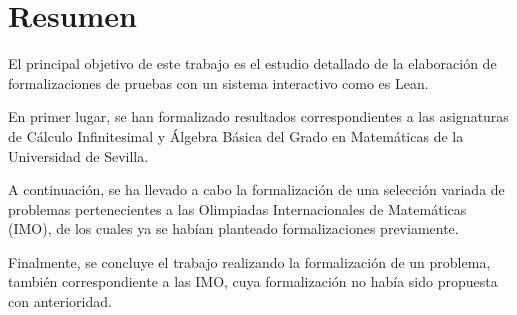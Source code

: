 \chapter*{Resumen}

El principal objetivo de este trabajo es el estudio detallado de la
elaboración de formalizaciones de pruebas con un sistema interactivo
como es Lean.

En primer lugar, se han formalizado resultados correspondientes a las
asignaturas de Cálculo Infinitesimal y Álgebra Básica del Grado en
Matemáticas de la Universidad de Sevilla.

A continuación, se ha llevado a cabo la formalización de una selección
variada de problemas pertenecientes a las Olimpiadas Internacionales de
Matemáticas (IMO), de los cuales ya se habían planteado formalizaciones
previamente.

Finalmente, se concluye el trabajo realizando la formalización de un
problema, también correspondiente a las IMO, cuya formalización no había
sido propuesta con anterioridad.


